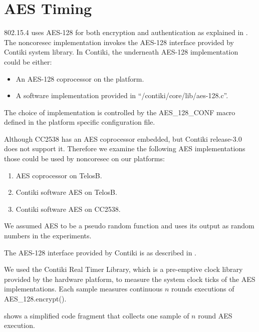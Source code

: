 \section{AES Timing} \label{Sec: AES Timing}

802.15.4 uses AES-128 for both encryption and authentication as explained in . The noncoresec implementation invokes the AES-128 interface provided by Contiki system library. In Contiki, the underneath AES-128 implementation could be either:
\begin{itemize}
	\item An AES-128 coprocessor on the platform.
	\item A software implementation provided in ``/contiki/core/lib/aes-128.c''.
\end{itemize}

The choice of implementation is controlled by the AES\_128\_CONF macro defined in the platform specific configuration file.

Although CC2538 has an AES coprocessor embedded, but Contiki release-3.0 does not support it. Therefore we examine the following AES implementations those could be used by noncoresec on our platforms:

\begin{enumerate}
	\item AES coprocessor on TelosB.
	\item Contiki software AES on TelosB.
	\item Contiki software AES on CC2538.
\end{enumerate}

We assumed AES to be a pseudo random function and uses its output as random numbers in the experiments.

The AES-128 interface provided by Contiki is as described in .

 

We used the Contiki Real Timer Library\cite{RTimer}, which is a pre-emptive clock library provided by the hardware platform, to measure the system clock ticks of the AES implementations. Each sample measures continuous $n$ rounds executions of AES\_128.encrypt(). 

 shows a simplified code fragment that collects one sample of $n$ round AES execution.

 

